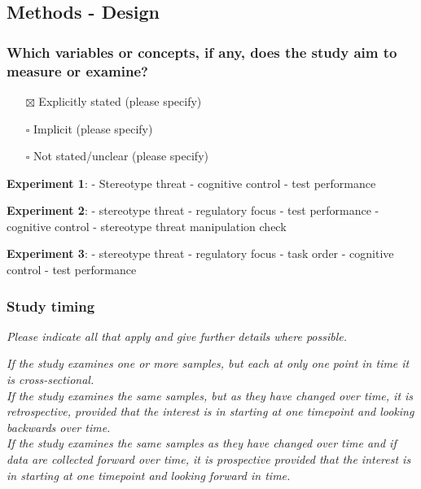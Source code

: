 \documentclass[
  doc, a4paper]{apa7}
\providecommand{\tightlist}{%
  \setlength{\itemsep}{0pt}\setlength{\parskip}{0pt}}
\begin{document}
\subsection{Methods - Design}\label{methods---design}

\subsubsection{Which variables or concepts, if any, does the study aim to measure or examine?}\label{which-variables-or-concepts-if-any-does-the-study-aim-to-measure-or-examine}

\begin{itemize}
\tightlist
\item[$\boxtimes$]
  Explicitly stated (please specify)\\
\item[$\square$]
  Implicit (please specify)\\
\item[$\square$]
  Not stated/unclear (please specify)
\end{itemize}

\textbf{Experiment 1}:
- Stereotype threat
- cognitive control
- test performance

\textbf{Experiment 2}:
- stereotype threat
- regulatory focus
- test performance
- cognitive control
- stereotype threat manipulation check

\textbf{Experiment 3}:
- stereotype threat
- regulatory focus
- task order
- cognitive control
- test performance

\subsubsection{Study timing}\label{study-timing}

\emph{Please indicate all that apply and give further details where possible.}

\emph{If the study examines one or more samples, but each at only one point in time it is cross-sectional.}\\
\emph{If the study examines the same samples, but as they have changed over time, it is retrospective, provided that the interest is in starting at one timepoint and looking backwards over time.}\\
\emph{If the study examines the same samples as they have changed over time and if data are collected forward over time, it is prospective provided that the interest is in starting at one timepoint and looking forward in time.}
\end{document}

